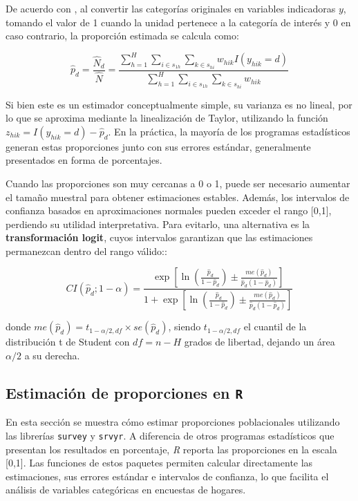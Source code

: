 \documentclass[
  spanish,
  12pt,
]{book}
\begin{document}
De acuerdo con \citet{heeringa2017applied}, al convertir las categorías originales en variables indicadoras \(y\), tomando el valor de 1 cuando la unidad pertenece a la categoría de interés y 0 en caso contrario, la proporción estimada se calcula como:

\[\hat{p}_d = \frac{\hat{N}_d}{\hat{N}} = \frac{\displaystyle\sum_{h=1}^{H} \sum_{i \in s_{1h}} \sum_{k \in s_{hi}} w_{hik} I(y_{hik}=d)} {\displaystyle\sum_{h=1}^{H} \sum_{i \in s_{1h}} \sum_{k \in s_{hi}} w_{hik}}\]

Si bien este es un estimador conceptualmente simple, su varianza es no lineal, por lo que se aproxima mediante la linealización de Taylor, utilizando la función \(z_{hik}=I(y_{hik}=d)-\hat{p}_d\). En la práctica, la mayoría de los programas estadísticos generan estas proporciones junto con sus errores estándar, generalmente presentados en forma de porcentajes.

Cuando las proporciones son muy cercanas a 0 o 1, puede ser necesario aumentar el tamaño muestral para obtener estimaciones estables. Además, los intervalos de confianza basados en aproximaciones normales pueden exceder el rango {[}0,1{]}, perdiendo su utilidad interpretativa. Para evitarlo, una alternativa es la \textbf{transformación logit}, cuyos intervalos garantizan que las estimaciones permanezcan dentro del rango válido::

\[CI(\hat{p}_d; 1-\alpha) = \frac{\exp \left[\ln\left(\frac{\hat{p}_d}{1-\hat{p}_d}\right) \pm \frac{me(\hat{p}_d)}{\hat{p}_d(1-\hat{p}_d)}\right]}{1 + \exp \left[\ln\left(\frac{\hat{p}_d}{1-\hat{p}_d}\right) \pm \frac{me(\hat{p}_d)}{\hat{p}_d(1-\hat{p}_d)}\right]}\]

donde \(me(\hat{p}_d) = t_{1-\alpha/2, df} \times se(\hat{p}_d)\), siendo \(t_{1-\alpha/2, df}\) el cuantil de la distribución t de Student con \(df = n - H\) grados de libertad, dejando un área \(\alpha/2\) a su derecha.

\subsection{\texorpdfstring{Estimación de proporciones en \texttt{R}}{Estimación de proporciones en R}}\label{estimaciuxf3n-de-proporciones-en-r}

En esta sección se muestra cómo estimar proporciones poblacionales utilizando las librerías \texttt{survey} y \texttt{srvyr}. A diferencia de otros programas estadísticos que presentan los resultados en porcentaje, \emph{R} reporta las proporciones en la escala {[}0,1{]}. Las funciones de estos paquetes permiten calcular directamente las estimaciones, sus errores estándar e intervalos de confianza, lo que facilita el análisis de variables categóricas en encuestas de hogares.
\end{document}
